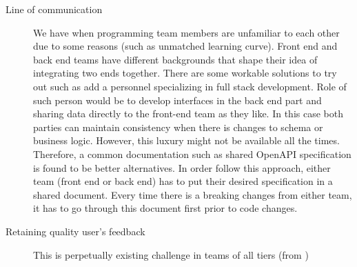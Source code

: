 \begin{description}
	\item[Line of communication] We have  when programming team members are unfamiliar to each other due to some reasons (such as unmatched learning curve). Front end and back end teams have different backgrounds that shape their idea of integrating two ends together. There are some workable solutions to try out such as add a personnel specializing in full stack development. Role of such person would be to develop interfaces in the back end part and sharing data directly to the front-end team as they like. In this case both parties can maintain consistency when there is changes to schema or business logic. However, this luxury might not be available all the times. Therefore, a common documentation such as shared OpenAPI specification \cite{2024_OpenAPI3.0} is found to be better alternatives. In order follow this approach, either team (front end or back end) has to put their desired specification in a shared document. Every time there is a breaking changes from either team, it has to go through this document first prior to code changes.
	
	\item[Retaining quality user's feedback] This is perpetually existing challenge in teams of all tiers (from )
\end{description}

\clearpage